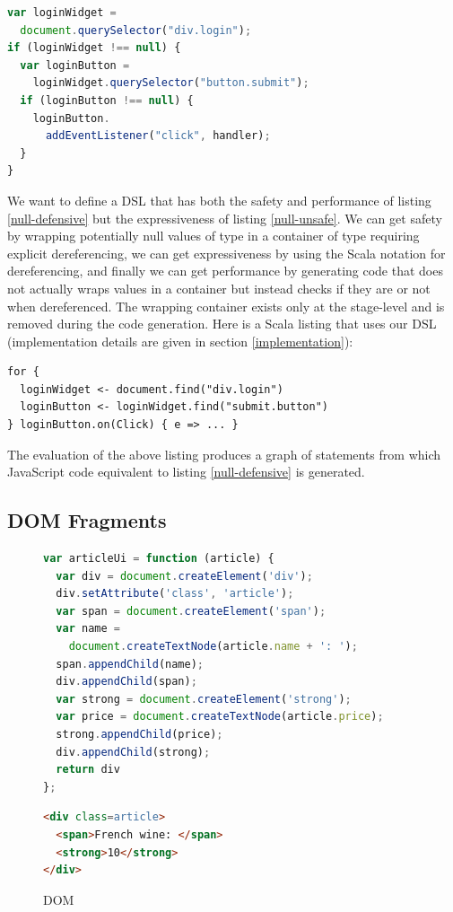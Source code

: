 \documentclass[preprint]{sigplanconf}
\begin{document}
\begin{lstlisting}[language=JavaScript,label=null-defensive,caption=Defensive programming to handle null references]
var loginWidget =
  document.querySelector("div.login");
if (loginWidget !== null) {
  var loginButton =
    loginWidget.querySelector("button.submit");
  if (loginButton !== null) {
    loginButton.
      addEventListener("click", handler);
  }
}
\end{lstlisting}

We want to define a DSL that has both the safety and performance of listing \ref{null-defensive} but the
expressiveness of listing \ref{null-unsafe}. We can get safety by wrapping potentially null values of type
 in a container of type  requiring explicit dereferencing, we can get
expressiveness by using the Scala  notation for dereferencing, and finally we can get performance by
generating code that does not actually wraps values in a container but instead checks if they are  or not
when dereferenced. The wrapping container exists only at the stage-level and is removed during the code generation.
Here is a Scala listing that uses our DSL (implementation details are given in section \ref{implementation}):

\begin{lstlisting}
for {
  loginWidget <- document.find("div.login")
  loginButton <- loginWidget.find("submit.button")
} loginButton.on(Click) { e => ... }
\end{lstlisting}

The evaluation of the above listing produces a graph of statements from which JavaScript code equivalent to
listing \ref{null-defensive} is generated.

\subsection{DOM Fragments}

\begin{figure}
\label{dom-api}
\begin{lstlisting}[language=JavaScript]
var articleUi = function (article) {
  var div = document.createElement('div');
  div.setAttribute('class', 'article');
  var span = document.createElement('span');
  var name =
    document.createTextNode(article.name + ': ');
  span.appendChild(name);
  div.appendChild(span);
  var strong = document.createElement('strong');
  var price = document.createTextNode(article.price);
  strong.appendChild(price);
  div.appendChild(strong);
  return div
};
\end{lstlisting}

\begin{lstlisting}[language=HTML]
<div class=article>
  <span>French wine: </span>
  <strong>10</strong>
</div>
\end{lstlisting}
\caption{DOM}
\end{figure}
\end{document}
